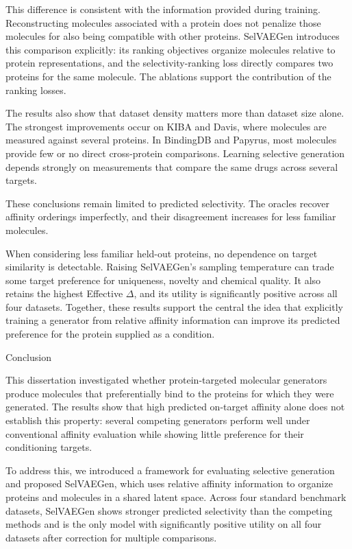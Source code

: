 \documentclass[a4paper,12pt]{article}
\begin{document}
This difference is consistent with the information provided during training. Reconstructing molecules associated with a protein does not penalize those molecules for also being compatible with other proteins. SelVAEGen introduces this comparison explicitly: its ranking objectives organize molecules relative to protein representations, and the selectivity-ranking loss directly compares two proteins for the same molecule. The ablations support the contribution of the ranking losses.

The results also show that dataset density matters more than dataset size alone. The strongest improvements occur on KIBA and Davis, where molecules are measured against several proteins. In BindingDB and Papyrus, most molecules provide few or no direct cross-protein comparisons. Learning selective generation depends strongly on measurements that compare the same drugs across several targets.

These conclusions remain limited to predicted selectivity. The oracles recover affinity orderings imperfectly, and their disagreement increases for less familiar molecules.

When considering less familiar held-out proteins, no dependence on target similarity is detectable. Raising SelVAEGen's sampling temperature can trade some target preference for uniqueness, novelty and chemical quality. It also retains the highest Effective $\Delta$, and its utility is significantly positive across all four datasets. Together, these results support the central the idea that explicitly training a generator from relative affinity information can improve its predicted preference for the protein supplied as a condition.

\newpage
\chapteropeninginline
{Conclusion}

This dissertation investigated whether protein-targeted molecular generators produce molecules that preferentially bind to the proteins for which they were generated. The results show that high predicted on-target affinity alone does not establish this property: several competing generators perform well under conventional affinity evaluation while showing little preference for their conditioning targets.

To address this, we introduced a framework for evaluating selective generation and proposed SelVAEGen, which uses relative affinity information to organize proteins and molecules in a shared latent space. Across four standard benchmark datasets, SelVAEGen shows stronger predicted selectivity than the competing methods and is the only model with significantly positive utility on all four datasets after correction for multiple comparisons.
\end{document}
